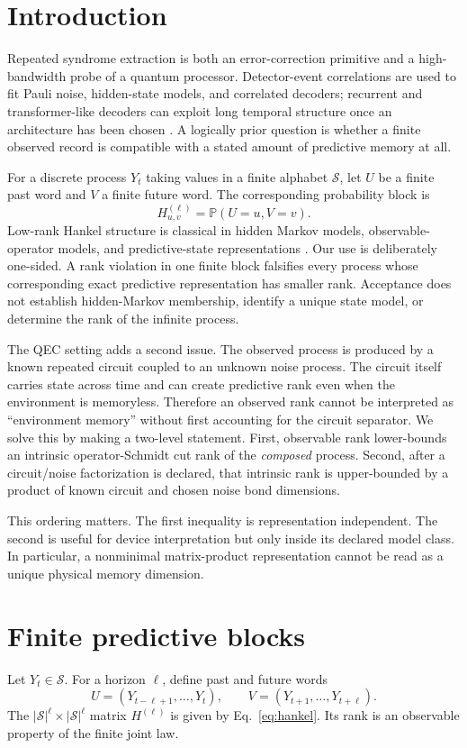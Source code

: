 \documentclass[11pt]{article}
\newcommand{\Prob}{\mathbb{P}}
\begin{document}
\section{Introduction}
Repeated syndrome extraction is both an error-correction primitive and a high-bandwidth probe of a quantum processor. Detector-event correlations are used to fit Pauli noise, hidden-state models, and correlated decoders; recurrent and transformer-like decoders can exploit long temporal structure once an architecture has been chosen \cite{Varbanov,Bausch}. A logically prior question is whether a finite observed record is compatible with a stated amount of predictive memory at all.

For a discrete process $Y_t$ taking values in a finite alphabet $\mathcal S$, let $U$ be a finite past word and $V$ a finite future word. The corresponding probability block is
\begin{equation}
H_{u,v}^{(\ell)}=\Prob(U=u,V=v).
\label{eq:hankel}
\end{equation}
Low-rank Hankel structure is classical in hidden Markov models, observable-operator models, and predictive-state representations \cite{Jaeger,Littman,Hsu}. Our use is deliberately one-sided. A rank violation in one finite block falsifies every process whose corresponding exact predictive representation has smaller rank. Acceptance does not establish hidden-Markov membership, identify a unique state model, or determine the rank of the infinite process.

The QEC setting adds a second issue. The observed process is produced by a known repeated circuit coupled to an unknown noise process. The circuit itself carries state across time and can create predictive rank even when the environment is memoryless. Therefore an observed rank cannot be interpreted as ``environment memory'' without first accounting for the circuit separator. We solve this by making a two-level statement. First, observable rank lower-bounds an intrinsic operator-Schmidt cut rank of the \emph{composed} process. Second, after a circuit/noise factorization is declared, that intrinsic rank is upper-bounded by a product of known circuit and chosen noise bond dimensions.

This ordering matters. The first inequality is representation independent. The second is useful for device interpretation but only inside its declared model class. In particular, a nonminimal matrix-product representation cannot be read as a unique physical memory dimension.

\section{Finite predictive blocks}
Let $Y_t\in\mathcal S$. For a horizon $\ell$, define past and future words
\[
U=(Y_{t-\ell+1},\ldots,Y_t),\qquad V=(Y_{t+1},\ldots,Y_{t+\ell}).
\]
The $|\mathcal S|^\ell\times|\mathcal S|^\ell$ matrix $H^{(\ell)}$ is given by Eq.~\eqref{eq:hankel}. Its rank is an observable property of the finite joint law.
\end{document}

